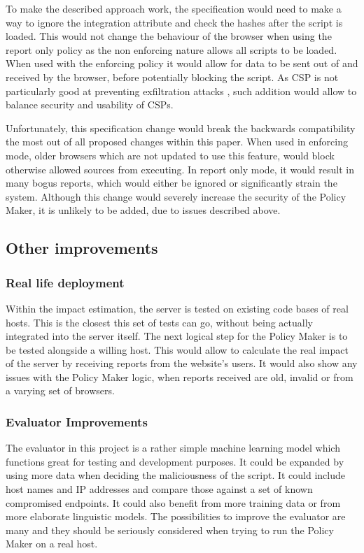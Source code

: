 To make the described approach work, the specification would need to make a way to ignore the integration attribute and check the hashes after the script is loaded.
This would not change the behaviour of the browser when using the report only policy as the non enforcing nature allows all scripts to be loaded.
When used with the enforcing policy it would allow for data to be sent out of and received by the browser, before potentially blocking the script.
As CSP is not particularly good at preventing exfiltration attacks \cite{CSPexfil}, such addition would allow to balance security and usability of CSPs.

Unfortunately, this specification change would break the backwards compatibility the most out of all proposed changes within this paper.
When used in enforcing mode, older browsers which are not updated to use this feature, would block otherwise allowed sources from executing.
In report only mode, it would result in many bogus reports, which would either be ignored or significantly strain the system.
Although this change would severely increase the security of the Policy Maker, it is unlikely to be added, due to issues described above.

\subsection{Other improvements}

\subsubsection{Real life deployment}

Within the impact estimation, the server is tested on existing code bases of real hosts.
This is the closest this set of tests can go, without being actually integrated into the server itself.
The next logical step for the Policy Maker is to be tested alongside a willing host.
This would allow to calculate the real impact of the server by receiving reports from the website's users.
It would also show any issues with the Policy Maker logic, when reports received are old, invalid or from a varying set of browsers.

\subsubsection{Evaluator Improvements}

The evaluator in this project is a rather simple machine learning model which functions great for testing and development purposes.
It could be expanded by using more data when deciding the maliciousness of the script.
It could include host names and IP addresses and compare those against a set of known compromised endpoints.
It could also benefit from more training data or from more elaborate linguistic models.
The possibilities to improve the evaluator are many and they should be seriously considered when trying to run the Policy Maker on a real host.


